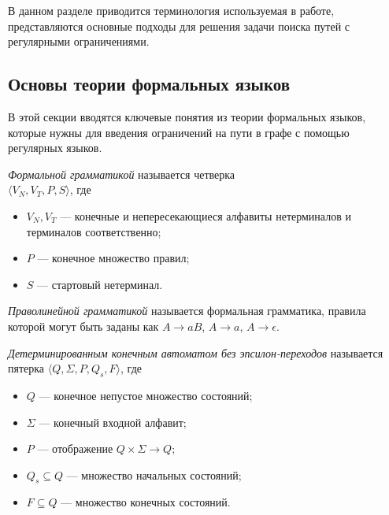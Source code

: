 
\label{sec:relatedworks}
В данном разделе приводится терминология используемая в работе, представляются основные подходы для решения задачи поиска путей с регулярными ограничениями.

\subsection{Основы теории формальных языков}

В этой секции вводятся ключевые понятия из теории формальных языков, которые нужны для введения ограничений на пути в графе с помощью регулярных языков.

\begin{rudefinition} \emph{Формальной грамматикой} называется четверка \\ $\langle V_N, V_T, P, S \rangle$, где
    \begin{itemize}
        \item $V_N, V_T$ --- конечные и непересекающиеся алфавиты нетерминалов и терминалов соответственно;
        \item $P$ --- конечное множество правил;
        \item $S$ --- стартовый нетерминал.
    \end{itemize}
\end{rudefinition}

\begin{rudefinition} \emph{Праволинейной грамматикой} называется формальная грамматика, правила которой могут быть заданы как $A \rightarrow aB$, $A \rightarrow a$, $A \rightarrow \epsilon$.
\end{rudefinition}

\begin{rudefinition}
    \emph{Детерминированным конечным автоматом без эпсилон-переходов} называется пятерка $\langle Q, \Sigma, P, Q_{s}, F \rangle$, где
    \begin{itemize}
        \item $Q$ --- конечное непустое множество состояний;
        \item $\Sigma$ --- конечный входной алфавит;
        \item $P$ --- отображение $Q \times \Sigma \rightarrow Q$;
        \item $Q_{s} \subseteq Q$ --- множество начальных состояний;
        \item $F \subseteq Q$ --- множество конечных состояний.
    \end{itemize}
\end{rudefinition}

